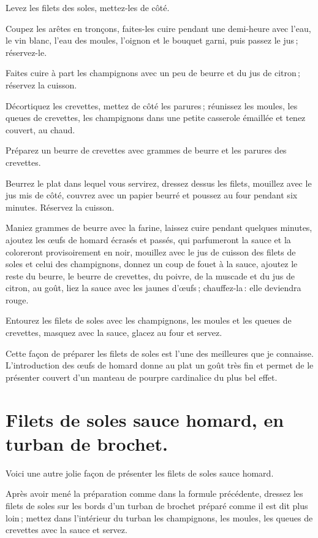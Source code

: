 Levez les filets des soles, mettez-les de côté.

Coupez les arêtes en tronçons, faites-les cuire pendant une demi-heure avec
l'eau, le vin blanc, l'eau des moules, l'oignon et le bouquet garni, puis
passez le jus ; réservez-le.

Faites cuire à part les champignons avec un peu de beurre et du jus de citron ;
réservez la cuisson.

Décortiquez les crevettes, mettez de côté les parures ; réunissez les moules,
les queues de crevettes, les champignons dans une petite casserole émaillée et
tenez couvert, au chaud.

Préparez un beurre de crevettes avec {\mmm} grammes de beurre et les
parures des crevettes.

Beurrez le plat dans lequel vous servirez, dressez dessus les filets, mouillez
avec le jus mis de côté, couvrez avec un papier beurré et poussez au four
pendant six minutes. Réservez la cuisson.

Maniez {\mmm} grammes de beurre avec la farine, laissez cuire pendant
quelques minutes, ajoutez les œufs de homard écrasés et passés, qui parfumeront
la sauce et la coloreront provisoirement en noir, mouillez avec le jus de
cuisson des filets de soles et celui des champignons, donnez un coup de fouet
à la sauce, ajoutez le reste du beurre, le beurre de crevettes, du poivre, de
la muscade et du jus de citron, au goût, liez la sauce avec les jaunes d'œufs ;
chauffez-la : elle deviendra rouge.

Entourez les filets de soles avec les champignons, les moules et les queues de
crevettes, masquez avec la sauce, glacez au four et servez.

Cette façon de préparer les filets de soles est l'une des meilleures que je
connaisse. L'introduction des œufs de homard donne au plat un goût très fin et
permet de le présenter couvert d'un manteau de pourpre cardinalice du plus bel
effet.

\section*{\centering Filets de soles sauce homard, en turban de brochet.}

Voici une autre jolie façon de présenter les filets de soles sauce homard.

Après avoir mené la préparation comme dans la formule précédente, dressez les
filets de soles sur les bords d'un turban de brochet préparé comme il est dit
plus loin ; mettez dans l'intérieur du turban les champignons, les moules, les
queues de crevettes avec la sauce et servez.

